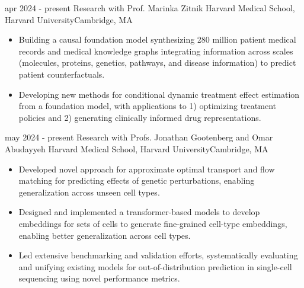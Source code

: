 

\begin{cventries}



    \cventry
    {apr 2024 - present}
    {Research with Prof. Marinka Zitnik}
    {Harvard Medical School, Harvard University}{Cambridge, MA}
    {\vspace{-4mm}\begin{itemize}[leftmargin=5mm]
       \item Building a causal foundation model synthesizing 280 million patient medical records and medical knowledge graphs integrating information across scales (molecules, proteins, genetics, pathways, and disease information) to predict patient counterfactuals.
       \item Developing new methods for conditional dynamic treatment effect estimation from a foundation model, with applications to 1) optimizing treatment policies and 2) generating clinically informed drug representations.
     \end{itemize}}\vspace{-4mm}

    \cventry
    {may 2024 - present}
    {Research with Profs. Jonathan Gootenberg and Omar Abudayyeh}
    {Harvard Medical School, Harvard University}{Cambridge, MA}
    {\vspace{-4mm}\begin{itemize}[leftmargin=5mm]
    \item Developed novel approach for approximate optimal transport and flow matching for predicting effects of genetic perturbations, enabling generalization across unseen cell types.
    \item Designed and implemented a transformer-based models to develop embeddings for sets of cells to generate fine-grained cell-type embeddings, enabling better generalization across cell types.
    \item Led extensive benchmarking and validation efforts, systematically evaluating and unifying existing models for out-of-distribution prediction in single-cell sequencing using novel performance metrics.
         \end{itemize}}\vspace{-4mm}
     

\end{cventries}

